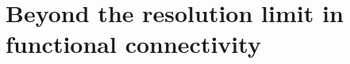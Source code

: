 \chapter{Beyond the resolution limit in functional connectivity}



%

\listoffigures
\listoftables





%	
